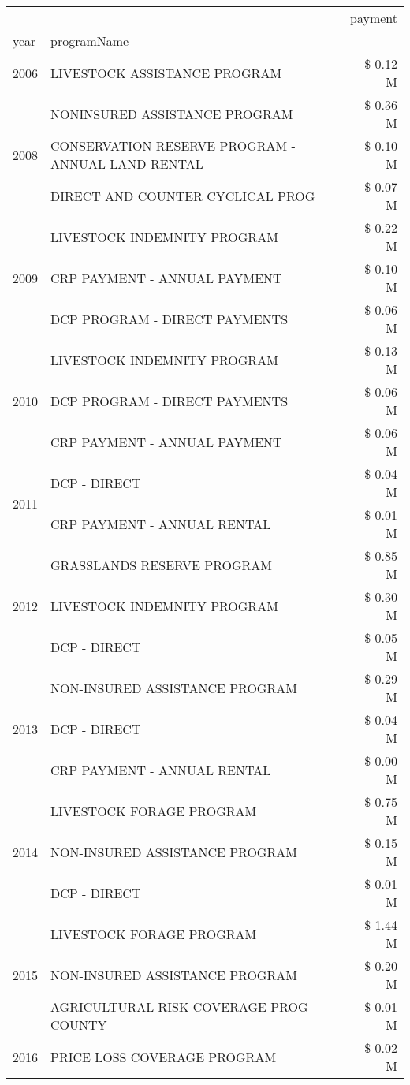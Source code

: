 \begin{tabular}{llr}
\toprule
 &  & payment \\
year & programName &  \\
\midrule
2006 & LIVESTOCK ASSISTANCE PROGRAM & \$ 0.12 M \\
\cline{1-3}
\multirow[t]{3}{*}{2008} & NONINSURED ASSISTANCE PROGRAM & \$ 0.36 M \\
 & CONSERVATION RESERVE PROGRAM - ANNUAL LAND RENTAL & \$ 0.10 M \\
 & DIRECT AND COUNTER CYCLICAL PROG & \$ 0.07 M \\
\cline{1-3}
\multirow[t]{3}{*}{2009} & LIVESTOCK INDEMNITY PROGRAM & \$ 0.22 M \\
 & CRP PAYMENT - ANNUAL PAYMENT & \$ 0.10 M \\
 & DCP PROGRAM - DIRECT PAYMENTS & \$ 0.06 M \\
\cline{1-3}
\multirow[t]{3}{*}{2010} & LIVESTOCK INDEMNITY PROGRAM & \$ 0.13 M \\
 & DCP PROGRAM - DIRECT PAYMENTS & \$ 0.06 M \\
 & CRP PAYMENT - ANNUAL PAYMENT & \$ 0.06 M \\
\cline{1-3}
\multirow[t]{2}{*}{2011} & DCP - DIRECT & \$ 0.04 M \\
 & CRP PAYMENT - ANNUAL RENTAL & \$ 0.01 M \\
\cline{1-3}
\multirow[t]{3}{*}{2012} & GRASSLANDS RESERVE PROGRAM & \$ 0.85 M \\
 & LIVESTOCK INDEMNITY PROGRAM & \$ 0.30 M \\
 & DCP - DIRECT & \$ 0.05 M \\
\cline{1-3}
\multirow[t]{3}{*}{2013} & NON-INSURED ASSISTANCE PROGRAM & \$ 0.29 M \\
 & DCP - DIRECT & \$ 0.04 M \\
 & CRP PAYMENT - ANNUAL RENTAL & \$ 0.00 M \\
\cline{1-3}
\multirow[t]{3}{*}{2014} & LIVESTOCK FORAGE PROGRAM & \$ 0.75 M \\
 & NON-INSURED ASSISTANCE PROGRAM & \$ 0.15 M \\
 & DCP - DIRECT & \$ 0.01 M \\
\cline{1-3}
\multirow[t]{3}{*}{2015} & LIVESTOCK FORAGE PROGRAM & \$ 1.44 M \\
 & NON-INSURED ASSISTANCE PROGRAM & \$ 0.20 M \\
 & AGRICULTURAL RISK COVERAGE PROG - COUNTY & \$ 0.01 M \\
\cline{1-3}
\multirow[t]{3}{*}{2016} & PRICE LOSS COVERAGE PROGRAM                   & \$ 0.02 M \\

\end{tabular}
